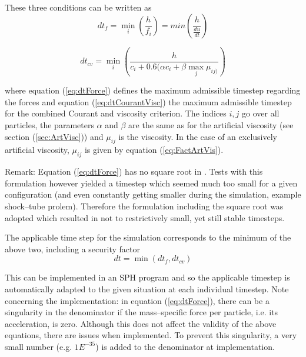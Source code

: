 \documentclass{report}
\begin{document}
These three conditions can be written as \cite{Monaghan1989,Monaghan1992}
\begin{equation}
\label{eq:dtForce}
 dt_f=\min_i\left(\frac{h}{f_i}\right)=min\left(\frac{h}{\frac{du}{dt}}\right)
\end{equation}

\begin{equation}
\label{eq:dtCourantVisc}
 dt_{cv}=\min_i\left(\frac{h}{c_i+0.6(\alpha c_i+\beta \max_j \mu_{ij)}}\right)
\end{equation}

where equation (\ref{eq:dtForce}) defines the maximum admissible timestep regarding the forces and equation (\ref{eq:dtCourantVisc}) the maximum admissible timestep for the combined Courant and viscosity criterion. The indices $i,j$ go over all particles, the parameters $\alpha$ and $\beta$ are the same as for the artificial viscosity (see section (\ref{sec:ArtVisc})) and $\mu_{ij}$ is the viscosity. In the case of an exclusively artificial viscosity, $\mu_{ij}$ is given by equation (\ref{eq:FactArtVis}).

Remark: Equation (\ref{eq:dtForce}) has no square root in \cite{Monaghan1992}. Tests with this formulation however yielded a timestep which seemed much too small for a given configuration (and even constantly getting smaller during the simulation, example shock--tube prolem). Therefore the formulation including the square root \cite{Monaghan1989} was adopted which resulted in not to restrictively small, yet still stable timesteps.

The applicable time step for the simulation corresponds to the minimum of the above two, including a security factor 
\begin{equation}
\label{eq:dt}
dt=\min(dt_f,dt_{cv})
\end{equation}

This can be implemented in an SPH program and so the applicable timestep is automatically adapted to the given situation at each individual timestep. 
Note concerning the implementation: in equation (\ref{eq:dtForce}), there can be a singularity in the denominator if the mass--specific force per particle, i.e. its acceleration, is zero. Although this does not affect the validity of the above equations, there are issues when implemented. To prevent this singularity, a very small number (e.g. $1E^{-35}$) is added to the denominator at implementation.
\end{document}
